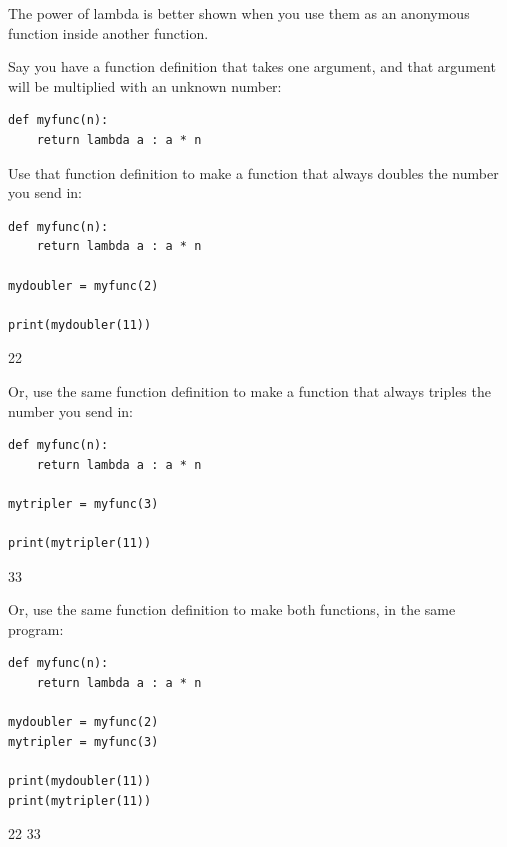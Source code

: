 \documentclass[12pt,a4paper]{article}
\begin{document}
The power of lambda is better shown when you use them as an anonymous function
inside another function.

Say you have a function definition that takes one argument, and that argument
will be multiplied with an unknown number:

\begin{lstlisting}
def myfunc(n):
    return lambda a : a * n
\end{lstlisting}

Use that function definition to make a function that always doubles the number
you send in:

\begin{ebox}
	\begin{lstlisting}
def myfunc(n):
    return lambda a : a * n

mydoubler = myfunc(2)

print(mydoubler(11))
	\end{lstlisting}
\tcblower
	\begin{vercode}
22
	\end{vercode}
\end{ebox}

Or, use the same function definition to make a function that always triples the
number you send in:

\begin{ebox}
	\begin{lstlisting}
def myfunc(n):
    return lambda a : a * n

mytripler = myfunc(3)

print(mytripler(11))
	\end{lstlisting}
\tcblower
	\begin{vercode}
33
	\end{vercode}
\end{ebox}

Or, use the same function definition to make both functions, in the same
program:

\begin{ebox}
	\begin{lstlisting}
def myfunc(n):
    return lambda a : a * n

mydoubler = myfunc(2)
mytripler = myfunc(3)

print(mydoubler(11))
print(mytripler(11))
	\end{lstlisting}
\tcblower
	\begin{vercode}
22
33
	\end{vercode}
\end{ebox}
\end{document}

